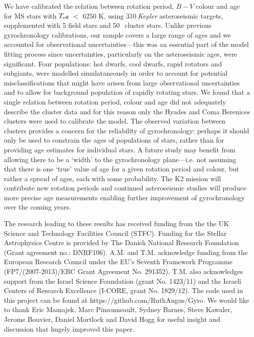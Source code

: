 \documentclass[10pt,preprint]{aastex}
\newcommand{\teff}{$T_{\rm{eff}}$}
\newcommand{\nastero}{310}
\newcommand{\nHC}{50~}
\begin{document}
We have calibrated the relation between rotation period, $B-V$ colour and age for MS stars with \teff$~<$ 6250 K, using \nastero$~${\it Kepler} asteroseismic targets, supplemented with 5 field stars and \nHC$~$cluster stars.
Unlike previous gyrochronology calibrations, our sample covers a large range of ages and we accounted for observational uncertainties---this was an essential part of the model fitting process since uncertainties, particularly on the asteroseismic ages, were significant.
Four populations: hot dwarfs, cool dwarfs, rapid rotators and subgiants, were modelled simulataneously in order to account for potential misclassifications that might have arisen from large observational uncertainties and to allow for background population of rapidly rotating stars.
We found that a single relation between rotation period, colour and age did not adequately describe the cluster data and for this reason only the Hyades and Coma Berenices clusters were used to calibrate the model.
The observed variation between clusters provides a concern for the reliability of gyrochronology: perhaps it should only be used to constrain the ages of populations of stars, rather than for providing age estimates for individual stars.
A future study may benefit from allowing there to be a `width' to the gyrochronology plane---i.e. not assuming that there is one `true' value of age for a given rotation period and colour, but rather a spread of ages, each with some probability.
The K2 mission will contribute new rotation periods and continued asteroseismic studies will produce more precise age measurements enabling further improvement of gyrochronology over the coming years.

The research leading to these results has received funding from the the UK Science and Technology Facilities Council (STFC).
Funding for the Stellar Astrophysics Centre is provided by The Danish National Research Foundation (Grant agreement no.: DNRF106).
A.M. and T.M. acknowledge funding from the European Research Council under the EU’s Seventh Framework Programme (FP7/(2007-2013)/ERC Grant Agreement No. 291352). T.M. also acknowledges support from the Israel Science Foundation (grant No. 1423/11) and the Israeli Centers of Research Excellence (I-CORE, grant No. 1829/12).
The code used in this project can be found at https://github.com/RuthAngus/Gyro.
We would like to thank Eric Mamajek, Marc Pinsonneault, Sydney Barnes, Steve Kawaler, Jerome Bouvier, Daniel Mortlock and David Hogg for useful insight and discussion that hugely improved this paper.
\end{document}
